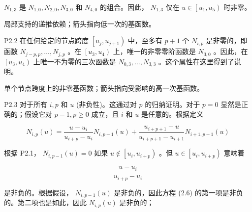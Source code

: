 \documentclass[../main.tex]{subfiles}
\begin{document}
\({N}_{1,3}\) 是 \({N}_{1,0},{N}_{2,0},{N}_{3,0}\) 和 \({N}_{4,0}\) 的组合。因此， \({N}_{1,3}\) 仅在 \(u \in  \left\lbrack  {{u}_{1},{u}_{5}}\right)\) 时非零。

\begin{center}
\begin{minipage}{10cm}
\vspace*{.6\baselineskip}
\centering
{}
\par\smallskip
局部支持的递推依赖；箭头指向低一次的基函数。
\end{minipage}
\end{center} 

P2.2 在任何给定的节点跨度 \(\left\lbrack  {{u}_{j},{u}_{j + 1}}\right)\) 中，至多有 \(p + 1\) 个 \({N}_{i,p}\) 是非零的，即函数 \({N}_{j - p,p},\ldots ,{N}_{j,p}\) 。在 \(\left\lbrack  {{u}_{3},{u}_{4}}\right)\) 上，唯一的非零零阶函数是 \({N}_{3,0}\) 。因此，在 \(\left\lbrack  {{u}_{3},{u}_{4}}\right)\) 上唯一不为零的三次函数是 \({N}_{0,3},\ldots ,{N}_{3,3}\) 。这个属性在这里得到了说明。

\begin{center}
\begin{minipage}{10cm}
\vspace*{.6\baselineskip}
\centering
{}
\par\smallskip
单个节点跨度上的非零基函数；箭头指向受影响的高一次基函数。
\end{minipage}
\end{center} 

P2.3 对于所有 \(i,p\) 和 \(u\) (非负性)。这通过对 \(p\) 的归纳证明。对于 \(p = 0\) 显然是正确的；假设它对 \(p - 1,p \geq  0\) 成立，且 \(i\) 和 \(u\) 是任意的。根据定义

\[
{N}_{i,p}\left( u\right)  = \frac{u - {u}_{i}}{{u}_{i + p} - {u}_{i}}{N}_{i,p - 1}\left( u\right)  + \frac{{u}_{i + p + 1} - u}{{u}_{i + p + 1} - {u}_{i + 1}}{N}_{i + 1,p - 1}\left( u\right)  \tag{2.6}
\]

根据 P2.1， \({N}_{i,p - 1}\left( u\right)  = 0\) 如果 \(u \notin  \left\lbrack  {{u}_{i},{u}_{i + p}}\right)\) 。但 \(u \in  \left\lbrack  {{u}_{i},{u}_{i + p}}\right)\) 意味着

\[
\frac{u - {u}_{i}}{{u}_{i + p} - {u}_{i}}
\]

是非负的。根据假设， \({N}_{i,p - 1}\left( u\right)\) 是非负的，因此方程 (2.6) 的第一项是非负的。第二项也是如此，因此 \({N}_{i,p}\left( u\right)\) 是非负的；
\end{document}
